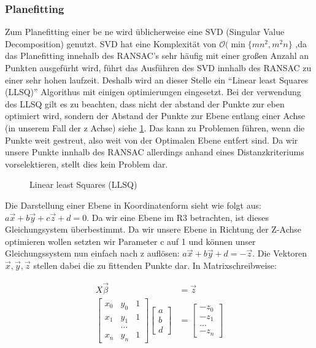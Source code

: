 \documentclass[11pt,oneside,openright]{mpreport}
\begin{document}
\subsubsection{Planefitting}
\label{subssec:planefitting}
Zum Planefitting einer be ne wird üblicherweise eine SVD (Singular Value Decomposition) genutzt. SVD hat eine Komplexität von $\mathcal{O}(\min\{mn^2, m^2n\}$ \cite{Holmes2007},da das Planefitting innehalb 
des RANSAC's sehr häufig mit einer großen Anzahl an Punkten ausgefürht wird, führt das Ausführen des SVD innhalb des RANSAC zu einer sehr hohen laufzeit.
Deshalb wird an dieser Stelle ein ``Linear least Squares (LLSQ)'' Algorithus mit einigen optimierungen eingesetzt. Bei der verwendung des LLSQ gilt es zu beachten,
dass nicht der abstand der Punkte zur eben optimiert wird, sondern der Abstand der Punkte zur Ebene entlang einer Achse (in unserem Fall der z Achse) siehe \cref{LLSQ_MIN}.
Das kann zu Problemen führen, wenn die Punkte weit gestreut, also weit von der Optimalen Ebene entfert sind. Da wir unsere Punkte innhalb des RANSAC allerdings anhand eines 
Distanzkriteriums vorselektieren, stellt dies kein Problem dar.

\begin{figure}[!ht]
\caption{Linear least Squares (LLSQ)  \cite{LLSQ}}

\label{LLSQ_MIN}
\end{figure}

Die Darstellung einer Ebene in Koordinatenform sieht wie folgt aus: $ a\vec{x} + b\vec{y} + c\vec{z} + d = 0 $. Da wir eine Ebene im R3 betrachten, ist dieses Gleichungsystem überbestimmt.
Da wir unsere Ebene in Richtung der Z-Achse optimieren wollen setzten wir Parameter c auf 1 und können unser Gleichungssystem nun einfach nach z auflösen: $a\vec{x} + b\vec{y} + d = -\vec{z}$.
Die Vektoren $\vec{x},\vec{y},\vec{z}$ stellen dabei die zu fittenden Punkte dar.
In Matrixschreibweise:

\begin{align*}
X \vec{\beta} &= \vec{z}\\
\begin{bmatrix}
x_0 & y_0 & 1 \\
x_1 & y_1 & 1 \\
 & \dots & \\
x_n & y_n & 1 
\end{bmatrix} 
\begin{bmatrix}
a \\
b \\
d 
\end{bmatrix}
&= 
\begin{bmatrix}
-z_0 \\
-z_1 \\
\dots \\
-z_n 
\end{bmatrix} 
\end{align*}
\end{document}
